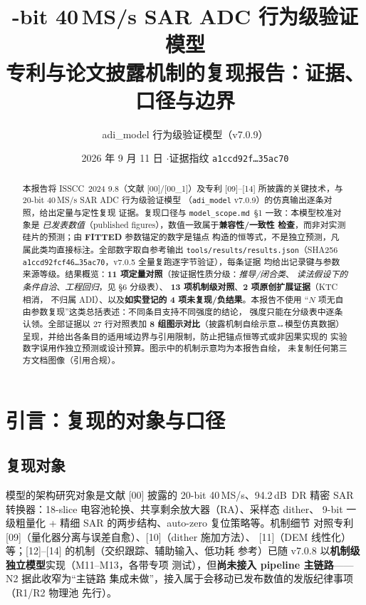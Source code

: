 \documentclass[11pt,a4paper,fontset=fandol]{ctexart}
\title{\heiti 20-bit 40\,MS/s SAR ADC 行为级验证模型\\[0.3em]
\Large 专利与论文披露机制的复现报告：证据、口径与边界}
\author{adi\_model 行为级验证模型（v7.0.9）}
\date{2026 年 9 月 11 日 \quad$\cdot$\quad 证据指纹
\texttt{a1ccd92f…35ac70}}
\newcommand{\GRADE}[1]{\textbf{#1}}
\begin{document}
\maketitle

\begin{abstract}
\noindent 本报告将 ISSCC~2024 9.8（文献 [00]/[00\_1]）及专利
[09]--[14] 所披露的关键技术，与 20-bit 40\,MS/s SAR ADC 行为级验证模型
（\texttt{adi\_model} v7.0.9）的仿真输出逐条对照，给出定量与定性复现
证据。复现口径与 \texttt{model\_scope.md}~\S1 一致：本模型校准对象是
\emph{已发表数值}（published figures），数值一致属于\textbf{兼容性/一致性
检查}，而非对实测硅片的预测；由 \GRADE{FITTED} 参数锚定的数字是锚点
构造的恒等式，不是独立预测，凡属此类均直接标注。全部数字取自参考输出
\texttt{tools/results/results.json}（SHA256
\texttt{a1ccd92fcf46…35ac70}，v7.0.5 全量复跑逐字节验证），每条证据
均给出记录键与参数来源等级。结果概览：\textbf{11 项定量对照}（按证据性质分级：\emph{推导/闭合类}、
\emph{读法假设下的条件自洽}、\emph{工程回归}，见 \S6 分级表）、
\textbf{13 项机制级对照}、\textbf{2 项原创扩展证据}（KTC 相消，
不归属 ADI）、以及\textbf{如实登记的 4 项未复现/负结果}。本报告不使用
``$N$ 项无自由参数复现''这类总括表述：不同条目支持不同强度的结论，
强度只能在分级表中逐条认领。全部证据以 27 行对照表加 \textbf{8 组图示对比}（披露机制自绘示意↔模型仿真数据）
呈现，并给出各条目的适用域边界与引用限制，防止把锚点恒等式或非因果实现的
实验数字误用作独立预测或设计预算。图示中的机制示意均为本报告自绘，
未复制任何第三方文档图像（引用合规）。
\end{abstract}

\clearpage
\tableofcontents
\newpage

\section{引言：复现的对象与口径}

\subsection{复现对象}

模型的架构研究对象是文献 [00] 披露的 20-bit 40\,MS/s、94.2\,dB~DR 精密
SAR 转换器：18-slice 电容池轮换、共享剩余放大器（RA）、采样态 dither、
9-bit 一级粗量化 + 精细 SAR 的两步结构、auto-zero 复位策略等。机制细节
对照专利 [09]（量化器分离与误差自愈）、[10]（dither 施加方法）、
[11]（DEM 线性化）等；[12]--[14] 的机制（交织跟踪、辅助输入、低功耗
参考）已随 v7.0.8 以\textbf{机制级独立模型}实现（M11--M13，各带专项
测试），但\textbf{尚未接入 pipeline 主链路}——N2 据此收窄为``主链路
集成未做''，接入属于会移动已发布数值的发版纪律事项（R1/R2 物理池
先行）。
\end{document}
